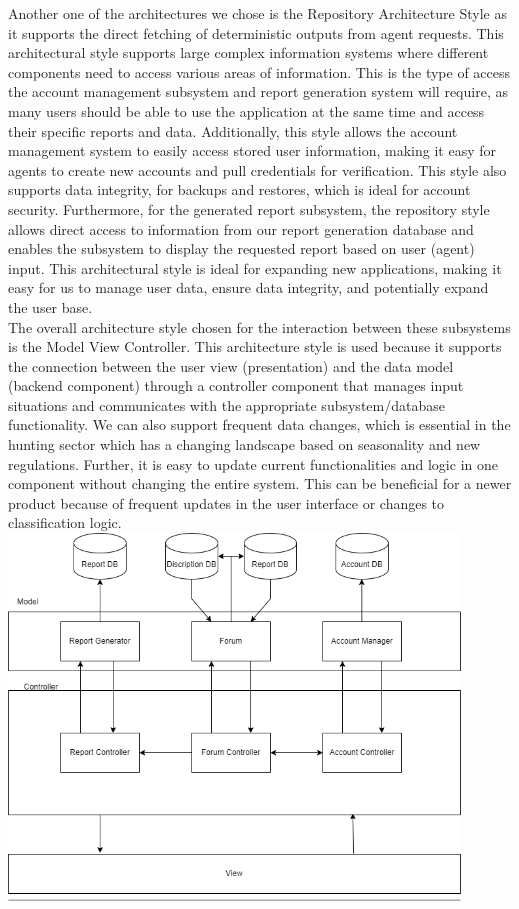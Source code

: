 \documentclass[]{article}
\begin{document}
Another one of the architectures we chose is the Repository Architecture Style as it supports the direct fetching of deterministic outputs from agent requests. This architectural style supports large complex information systems where different components need to access various areas of information. This is the type of access the account management subsystem and report generation system will require, as many users should be able to use the application at the same time and access their specific reports and data. Additionally, this style allows the account management system to easily access stored user information, making it easy for agents to create new accounts and pull credentials for verification. This style also supports data integrity, for backups and restores, which is ideal for account security. Furthermore, for the generated report subsystem, the repository style allows direct access to information from our report generation database and enables the subsystem to display the requested report based on user (agent) input. This architectural style is ideal for expanding new applications, making it easy for us to manage user data, ensure data integrity, and potentially expand the user base.
\\

The overall architecture style chosen for the interaction between these subsystems is the Model View Controller. This architecture style is used because it supports the connection between the user view (presentation) and the data model (backend component) through a controller component that manages input situations and communicates with the appropriate subsystem/database functionality. We can also support frequent data changes, which is essential in the hunting sector which has a changing landscape based on seasonality and new regulations. Further, it is easy to update current functionalities and logic in one component without changing the entire system. This can be beneficial for a newer product because of frequent updates in the user interface or changes to classification logic.  
\\

\includegraphics[width=0.9\textwidth]{architecture.png}
\\
\end{document}
